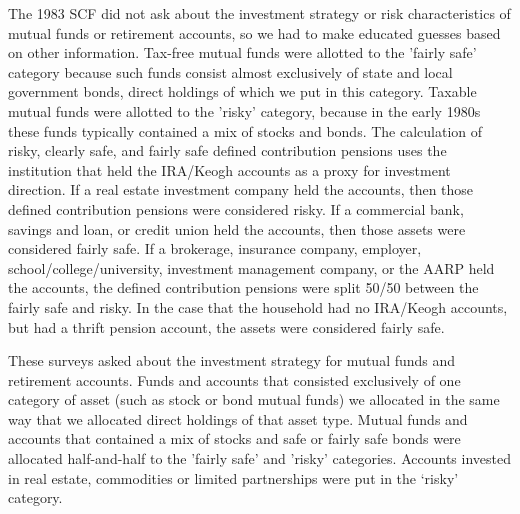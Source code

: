 \item[1983 SCF] The 1983 SCF did not ask about the investment strategy 
or risk characteristics of mutual funds or retirement accounts, so we 
had to make educated guesses based on other information.  Tax-free 
mutual funds were allotted to the 'fairly safe' category because such 
funds consist almost exclusively of state and local government bonds, 
direct holdings of which we put in this category.  Taxable mutual 
funds were allotted to the 'risky' category, because in the early 
1980s these funds typically contained a mix of stocks and bonds.  The 
calculation of risky, clearly safe, and fairly safe defined 
contribution pensions uses the institution that held the IRA/Keogh 
accounts as a proxy for investment direction.  If a real estate 
investment company held the accounts, then those defined contribution 
pensions were considered risky.  If a commercial bank, savings and 
loan, or credit union held the accounts, then those assets were 
considered fairly safe.  If a brokerage, insurance company, employer, 
school/college/university, investment management company, or the AARP 
held the accounts, the defined contribution pensions were split 50/50 
between the fairly safe and risky.  In the case that the household had 
no IRA/Keogh accounts, but had a thrift pension account, the assets 
were considered fairly safe.

\item[1989-1995 SCF] These surveys asked about the investment strategy 
for mutual funds and retirement accounts.  Funds and accounts that 
consisted exclusively of one category of asset (such as stock or bond 
mutual funds) we allocated in the same way that we allocated direct 
holdings of that asset type.  Mutual funds and accounts that contained 
a mix of stocks and safe or fairly safe bonds were allocated 
half-and-half to the 'fairly safe' and 'risky' categories.  Accounts 
invested in real estate, commodities or limited partnerships were put 
in the `risky' category.

